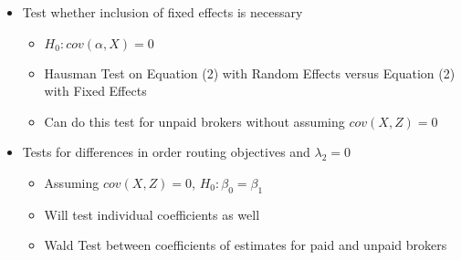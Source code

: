 \documentclass[12pt,a4paper]{article}
\begin{document}
		\begin{itemize}
		\setlength{\itemsep}{-1pt}
		\item Test whether inclusion of fixed effects is necessary
		\begin{itemize}
			\setlength{\itemsep}{-1pt}
			\item $H_0: cov(\alpha, X) = 0$
			\item Hausman Test on Equation (2) with Random Effects versus Equation (2) with Fixed Effects
			\item Can do this test for unpaid brokers without assuming $cov(X, Z) = 0$
		\end{itemize}
		\item Tests for differences in order routing objectives and $\lambda_2 = 0$
		\begin{itemize}
			\setlength{\itemsep}{-1pt}
			\item Assuming $cov(X, Z) = 0$, $H_0: \beta_0 = \beta_1$
			\item Will test individual coefficients as well
			\item Wald Test between coefficients of estimates for paid and unpaid brokers
		\end{itemize}
		\end{itemize}
	
\end{document}
